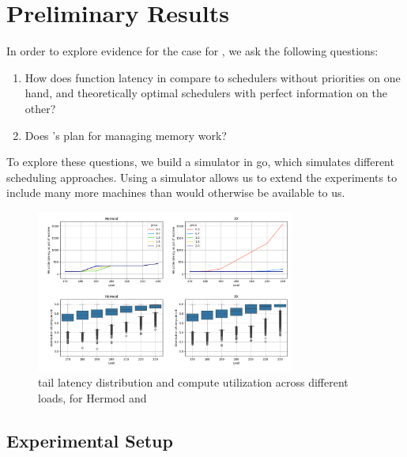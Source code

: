 \section{Preliminary Results}



In order to explore evidence for the case for \sys{}, we ask the following
questions: 
\begin{enumerate}
    \item How does function latency in \sys{} compare to schedulers without
    priorities on one hand, and theoretically optimal schedulers with perfect
    information on the other?
    \item Does \sys{}'s plan for managing memory work?
\end{enumerate}


To explore these questions, we build a simulator in go\cite{golang}, which
simulates different scheduling approaches. Using a simulator allows us to extend
the experiments to include many more machines than would otherwise be available
to us.

\begin{figure}[t!]
    \centering
      \includegraphics[width=8.5cm]{img/hermod_xx_latencies.png}
      \caption{ tail latency distribution and compute utilization across
      different loads, for Hermod and \sys{} }
    \label{fig:hermod-xx-edf}
\end{figure}


\subsection{Experimental Setup}

